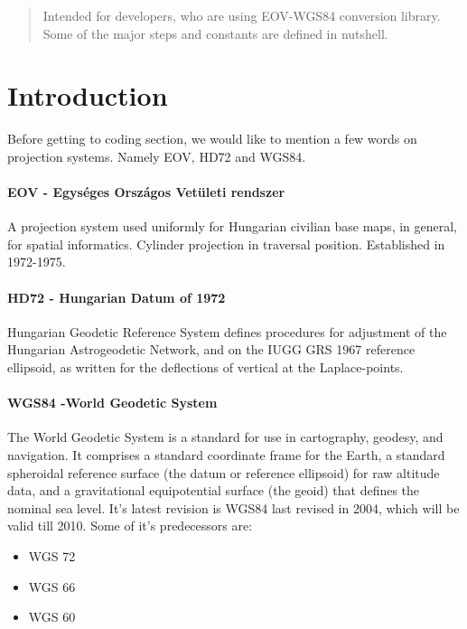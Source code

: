 \documentclass[10pt]{article}
\begin{document}
\newpage
\maketitle

\begin{abstract}
	Intended for developers, who are using EOV-WGS84 conversion library. 
	Some of the major steps and constants are defined in nutshell.
\end{abstract}

\newpage

\section{Introduction}
	Before getting to coding section, we would like to mention a few words on projection systems. Namely EOV, HD72 and WGS84.
	
\paragraph{EOV - Egységes Országos Vetületi rendszer}
	A projection system used uniformly for Hungarian civilian base maps, in general, for spatial informatics.
	Cylinder projection in traversal position. Established in 1972-1975.
	
\paragraph{HD72 - Hungarian Datum of 1972}
	Hungarian Geodetic Reference System defines procedures for adjustment of the Hungarian Astrogeodetic Network, 
	and on the IUGG GRS 1967 reference ellipsoid, as written for the deflections of vertical at the Laplace-points.
\paragraph{WGS84 -World Geodetic System}
	The World Geodetic System is a standard for use in cartography, geodesy, and navigation. 
	It comprises a standard coordinate frame for the Earth, a standard spheroidal reference surface 
	(the datum or reference ellipsoid) for raw altitude data, and a gravitational equipotential 
	surface (the geoid) that defines the nominal sea level. It's latest revision is WGS84 last revised in 2004, which 
	will be valid till 2010. Some of it's predecessors are:
	\begin{itemize}
		\item WGS 72
		\item WGS 66
		\item WGS 60
	\end{itemize}
\end{document}
